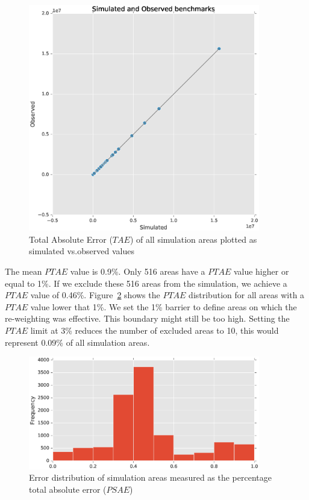\documentclass[runningheads,a4paper]{llncs}
\begin{document}
\begin{figure}
\centering
\includegraphics[width=0.9\textwidth]{FIGURES/TAE-scatter}
\caption{Total Absolute Error ($TAE$) of all simulation areas plotted as
simulated vs.\@ observed values}\label{fig:tae}
\end{figure}

The mean $PTAE$ value is 0.9\%. Only 516 areas have a $PTAE$ value higher or
equal to 1\%. If we exclude these 516 areas from the simulation, we achieve a
$PTAE$ value of 0.46\%. Figure~\ref{fig:ptae} shows the $PTAE$ distribution for
all areas with a $PTAE$ value lower that 1\%. We set the 1\% barrier to define
areas on which the re-weighting was effective. This boundary might still be too
high. Setting the $PTAE$ limit at 3\% reduces the number of excluded areas to
10, this would represent 0.09\% of all simulation areas.
\\

\begin{figure}
\centering
\includegraphics[width=0.9\textwidth]{FIGURES/PSAE}
\caption{Error distribution of simulation areas measured as the percentage
total absolute error ($PSAE$)}\label{fig:ptae}
\end{figure}
\end{document}
